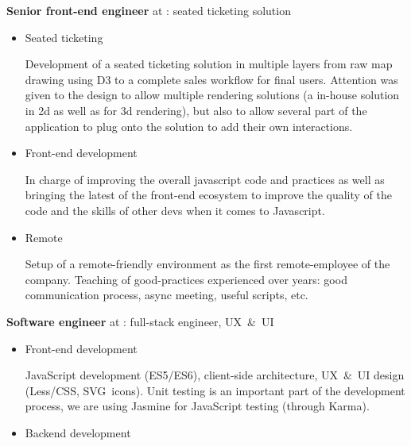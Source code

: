 \begin{rubric}{
}


\textbf{Senior front-end engineer} at : seated ticketing solution

\begin{itemize}
\item Seated ticketing

Development of a seated ticketing solution in multiple layers from raw map drawing using D3 to 
a complete sales workflow for final users. Attention was given to the design to allow multiple rendering
solutions (a in-house solution in 2d as well as  for 3d rendering),
but also to allow several part of the application to plug onto the solution to add their own interactions.

\item Front-end development

In charge of improving the overall javascript code and practices as well as bringing the latest of the front-end ecosystem
to improve the quality of the code and the skills of other devs when it comes to Javascript.

\item Remote

Setup of a remote-friendly environment as the first remote-employee of the company. Teaching of good-practices experienced over years:
good communication process, async meeting, useful scripts, etc.

\end{itemize}

\textbf{Software engineer} at : full-stack engineer, UX~\&~UI

\begin{itemize}
\item Front-end development

  JavaScript development (ES5/ES6), client-side architecture, UX~\&~UI design (Less/CSS,
  SVG~icons).  Unit testing is an important part of the development process, we
  are using Jasmine for JavaScript testing (through Karma).

\item Backend development


\end{itemize}
\end{rubric}
